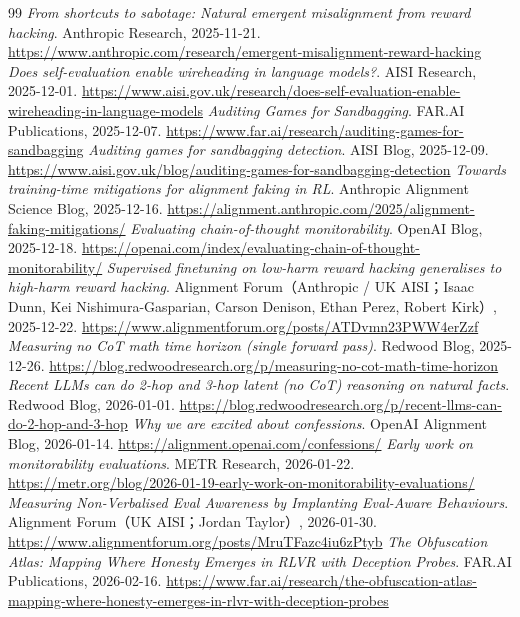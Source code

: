 \begin{thebibliography}{99}
 \textit{From shortcuts to sabotage: Natural emergent misalignment from reward hacking}. Anthropic Research, 2025-11-21. \url{https://www.anthropic.com/research/emergent-misalignment-reward-hacking}
 \textit{Does self-evaluation enable wireheading in language models?}. AISI Research, 2025-12-01. \url{https://www.aisi.gov.uk/research/does-self-evaluation-enable-wireheading-in-language-models}
 \textit{Auditing Games for Sandbagging}. FAR.AI Publications, 2025-12-07. \url{https://www.far.ai/research/auditing-games-for-sandbagging}
 \textit{Auditing games for sandbagging detection}. AISI Blog, 2025-12-09. \url{https://www.aisi.gov.uk/blog/auditing-games-for-sandbagging-detection}
 \textit{Towards training-time mitigations for alignment faking in RL}. Anthropic Alignment Science Blog, 2025-12-16. \url{https://alignment.anthropic.com/2025/alignment-faking-mitigations/}
 \textit{Evaluating chain-of-thought monitorability}. OpenAI Blog, 2025-12-18. \url{https://openai.com/index/evaluating-chain-of-thought-monitorability/}
 \textit{Supervised finetuning on low-harm reward hacking generalises to high-harm reward hacking}. Alignment Forum（Anthropic / UK AISI；Isaac Dunn, Kei Nishimura-Gasparian, Carson Denison, Ethan Perez, Robert Kirk）, 2025-12-22. \url{https://www.alignmentforum.org/posts/ATDvmn23PWW4erZzf}
 \textit{Measuring no CoT math time horizon (single forward pass)}. Redwood Blog, 2025-12-26. \url{https://blog.redwoodresearch.org/p/measuring-no-cot-math-time-horizon}
 \textit{Recent LLMs can do 2-hop and 3-hop latent (no CoT) reasoning on natural facts}. Redwood Blog, 2026-01-01. \url{https://blog.redwoodresearch.org/p/recent-llms-can-do-2-hop-and-3-hop}
 \textit{Why we are excited about confessions}. OpenAI Alignment Blog, 2026-01-14. \url{https://alignment.openai.com/confessions/}
 \textit{Early work on monitorability evaluations}. METR Research, 2026-01-22. \url{https://metr.org/blog/2026-01-19-early-work-on-monitorability-evaluations/}
 \textit{Measuring Non-Verbalised Eval Awareness by Implanting Eval-Aware Behaviours}. Alignment Forum（UK AISI；Jordan Taylor）, 2026-01-30. \url{https://www.alignmentforum.org/posts/MruTFazc4iu6zPtyb}
 \textit{The Obfuscation Atlas: Mapping Where Honesty Emerges in RLVR with Deception Probes}. FAR.AI Publications, 2026-02-16. \url{https://www.far.ai/research/the-obfuscation-atlas-mapping-where-honesty-emerges-in-rlvr-with-deception-probes}

\end{thebibliography}

